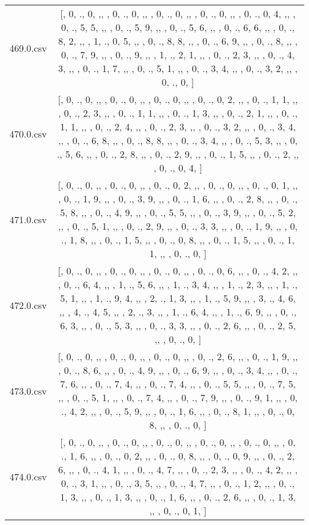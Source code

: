 \begin{table}[ht]
\begin{tabular}{@{}c c@{}}
	469.0.csv & [, 0, ., 0, ,,  , 0, ., 0, ,,  , 0, ., 0, ,,  , 0, ., 0, ,,  , 0, ., 0, 4, ,,  , 0, ., 5, 5, ,,  , 0, ., 5, 9, ,,  , 0, ., 5, 6, ,,  , 0, ., 6, 6, ,,  , 0, ., 8, 2, ,,  , 1, ., 0, 5, ,,  , 0, ., 8, 8, ,,  , 0, ., 6, 9, ,,  , 0, ., 8, ,,  , 0, ., 7, 9, ,,  , 0, ., 9, ,,  , 1, ., 2, 1, ,,  , 0, ., 2, 3, ,,  , 0, ., 4, 3, ,,  , 0, ., 1, 7, ,,  , 0, ., 5, 1, ,,  , 0, ., 3, 4, ,,  , 0, ., 3, 2, ,,  , 0, ., 0, ]\\ 
	470.0.csv & [, 0, ., 0, ,,  , 0, ., 0, ,,  , 0, ., 0, ,,  , 0, ., 0, 2, ,,  , 0, ., 1, 1, ,,  , 0, ., 2, 3, ,,  , 0, ., 1, 1, ,,  , 0, ., 1, 3, ,,  , 0, ., 2, 1, ,,  , 0, ., 1, 1, ,,  , 0, ., 2, 4, ,,  , 0, ., 2, 3, ,,  , 0, ., 3, 2, ,,  , 0, ., 3, 4, ,,  , 0, ., 6, 8, ,,  , 0, ., 8, 8, ,,  , 0, ., 3, 4, ,,  , 0, ., 5, 3, ,,  , 0, ., 5, 6, ,,  , 0, ., 2, 8, ,,  , 0, ., 2, 9, ,,  , 0, ., 1, 5, ,,  , 0, ., 2, ,,  , 0, ., 0, 4, ]\\ 
	471.0.csv & [, 0, ., 0, ,,  , 0, ., 0, ,,  , 0, ., 0, 2, ,,  , 0, ., 0, ,,  , 0, ., 0, 1, ,,  , 0, ., 1, 9, ,,  , 0, ., 3, 9, ,,  , 0, ., 1, 6, ,,  , 0, ., 2, 8, ,,  , 0, ., 5, 8, ,,  , 0, ., 4, 9, ,,  , 0, ., 5, 5, ,,  , 0, ., 3, 9, ,,  , 0, ., 5, 2, ,,  , 0, ., 5, 1, ,,  , 0, ., 2, 9, ,,  , 0, ., 3, 3, ,,  , 0, ., 1, 9, ,,  , 0, ., 1, 8, ,,  , 0, ., 1, 5, ,,  , 0, ., 0, 8, ,,  , 0, ., 1, 5, ,,  , 0, ., 1, 1, ,,  , 0, ., 0, ]\\ 
	472.0.csv & [, 0, ., 0, ,,  , 0, ., 0, ,,  , 0, ., 0, ,,  , 0, ., 0, 6, ,,  , 0, ., 4, 2, ,,  , 0, ., 6, 4, ,,  , 1, ., 5, 6, ,,  , 1, ., 3, 4, ,,  , 1, ., 2, 3, ,,  , 1, ., 5, 1, ,,  , 1, ., 9, 4, ,,  , 2, ., 1, 3, ,,  , 1, ., 5, 9, ,,  , 3, ., 4, 6, ,,  , 4, ., 4, 5, ,,  , 2, ., 3, ,,  , 1, ., 6, 4, ,,  , 1, ., 6, 9, ,,  , 0, ., 6, 3, ,,  , 0, ., 5, 3, ,,  , 0, ., 3, 3, ,,  , 0, ., 2, 6, ,,  , 0, ., 2, 5, ,,  , 0, ., 0, ]\\ 
	473.0.csv & [, 0, ., 0, ,,  , 0, ., 0, ,,  , 0, ., 0, ,,  , 0, ., 2, 6, ,,  , 0, ., 1, 9, ,,  , 0, ., 8, 6, ,,  , 0, ., 4, 9, ,,  , 0, ., 6, 9, ,,  , 0, ., 3, 4, ,,  , 0, ., 7, 6, ,,  , 0, ., 7, 4, ,,  , 0, ., 7, 4, ,,  , 0, ., 5, 5, ,,  , 0, ., 7, 5, ,,  , 0, ., 5, 1, ,,  , 0, ., 7, 4, ,,  , 0, ., 7, 9, ,,  , 0, ., 9, 1, ,,  , 0, ., 4, 2, ,,  , 0, ., 5, 9, ,,  , 0, ., 1, 6, ,,  , 0, ., 8, 1, ,,  , 0, ., 0, 8, ,,  , 0, ., 0, ]\\ 
	474.0.csv & [, 0, ., 0, ,,  , 0, ., 0, ,,  , 0, ., 0, ,,  , 0, ., 0, ,,  , 0, ., 0, ,,  , 0, ., 1, 6, ,,  , 0, ., 0, 2, ,,  , 0, ., 0, 8, ,,  , 0, ., 0, 9, ,,  , 0, ., 2, 6, ,,  , 0, ., 4, 1, ,,  , 0, ., 4, 7, ,,  , 0, ., 2, 3, ,,  , 0, ., 4, 2, ,,  , 0, ., 3, 1, ,,  , 0, ., 3, 5, ,,  , 0, ., 4, 7, ,,  , 0, ., 1, 2, ,,  , 0, ., 1, 3, ,,  , 0, ., 1, 3, ,,  , 0, ., 1, 6, ,,  , 0, ., 2, 6, ,,  , 0, ., 1, 3, ,,  , 0, ., 0, 1, ]\\ 

\end{tabular}
\end{table}
